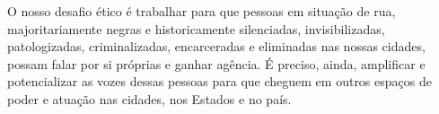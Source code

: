 \documentclass[14pt]{extarticle}
\begin{document}
O nosso desafio ético é trabalhar para que pessoas em situação de rua, majoritariamente negras e historicamente silenciadas, invisibilizadas, patologizadas, criminalizadas, encarceradas e eliminadas nas nossas cidades, possam falar por si próprias e ganhar agência. É preciso, ainda, amplificar e potencializar as vozes dessas pessoas para que cheguem em outros espaços de poder e atuação nas cidades, nos Estados e no país.\\


\newpage
%
%
\begingroup
{}

\endgroup
\end{document}

